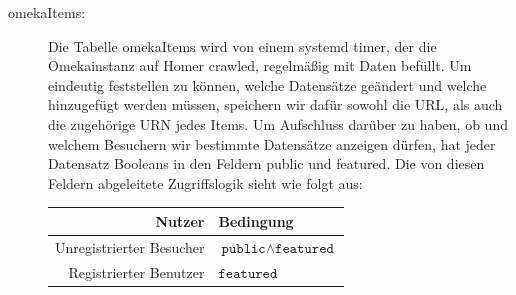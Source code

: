 \documentclass{article}
\begin{document}
\begin{description}
\item[omekaItems:]
    Die Tabelle omekaItems wird von einem systemd timer,
    der die Omekainstanz auf Homer crawled,
    regelmäßig mit Daten befüllt.
    Um eindeutig feststellen zu können,
    welche Datensätze geändert und welche hinzugefügt werden müssen,
    speichern wir dafür sowohl die URL,
    als auch die zugehörige URN jedes Items.
    Um Aufschluss darüber zu haben,
    ob und welchem Besuchern wir bestimmte Datensätze anzeigen dürfen,
    hat jeder Datensatz Booleans in den Feldern public und featured.
    Die von diesen Feldern abgeleitete Zugriffslogik sieht wie folgt aus:

    \begin{tabular}{r|l}
    Nutzer & Bedingung\\\hline
    Unregistrierter Besucher & $\texttt{public}\land\texttt{featured}$\\
    Registrierter Benutzer & $\texttt{featured}$
    \end{tabular}


\end{description}
\end{document}
